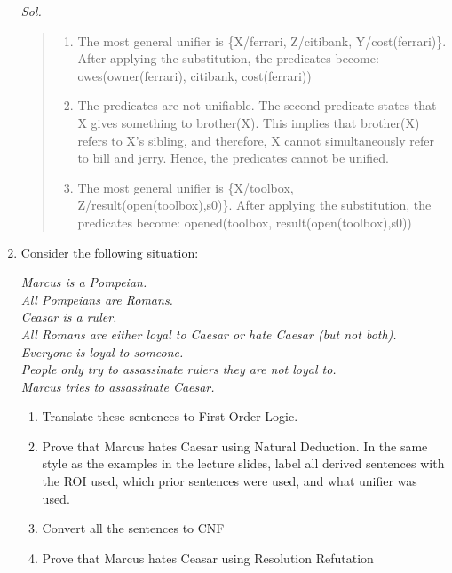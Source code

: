 \documentclass{article}
\theoremstyle{definition}
\newcommand{\<}{\langle}
\renewcommand{\>}{\rangle}
\begin{document}
\begin{enumerate}[label=\textbf{\arabic*.}]
  \vspace{1em} 
  \textit{ Sol. }
  \begin{quote}
  \begin{enumerate}
    \item The most general unifier is \{X/ferrari, Z/citibank, Y/cost(ferrari)\}. After applying the substitution, the predicates become:\newline
      owes(owner(ferrari), citibank, cost(ferrari))
    \item The predicates are not unifiable. The second predicate states that X gives something to brother(X). This implies that brother(X) refers to X's sibling, and therefore, X cannot simultaneously refer to bill and jerry. Hence, the predicates cannot be unified.
    \item The most general unifier is \{X/toolbox, Z/result(open(toolbox),s0)\}. After applying the substitution, the predicates become:\newline
      opened(toolbox, result(open(toolbox),s0))
  \end{enumerate}
  \end{quote}
  \newpage

  \item Consider the following situation:\newline

  \textit{
    Marcus is a Pompeian.\\
    All Pompeians are Romans.\\
    Ceasar is a ruler.\\
    All Romans are either loyal to Caesar or hate Caesar (but not both).\\
    Everyone is loyal to someone.\\
    People only try to assassinate rulers they are not loyal to.\\
    Marcus tries to assassinate Caesar.\\
  }
  \begin{enumerate}
    \item Translate these sentences to First-Order Logic.
    \item Prove that Marcus hates Caesar using Natural Deduction. In the same style as the examples in the lecture slides, label all derived sentences with the ROI used, which prior sentences were used, and what unifier was used.
    \item Convert all the sentences to CNF
    \item Prove that Marcus hates Ceasar using Resolution Refutation
  \end{enumerate}
  

\end{enumerate}
\end{document}
